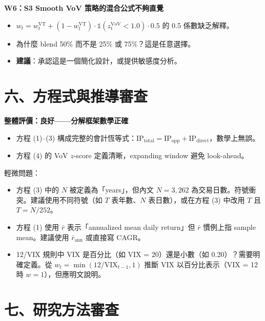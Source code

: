 \documentclass[12pt,a4paper]{article}
\begin{document}
\textcolor{warncolor}{\textbf{W6：S3 Smooth VoV 策略的混合公式不夠直覺}}

\begin{itemize}[leftmargin=2em]
\item $w_t = w_t^{\text{VT}} + (1 - w_t^{\text{VT}}) \cdot \mathbb{1}(z_t^{\text{VoV}} < 1.0) \cdot 0.5$ 的 0.5 係數缺乏解釋。
\item 為什麼 blend 50\% 而不是 25\% 或 75\%？這是任意選擇。
\item \textbf{建議}：承認這是一個簡化設計，或提供敏感度分析。
\end{itemize}

\section*{六、方程式與推導審查}

\textcolor{okgreen}{\textbf{整體評價：良好——分解框架數學正確}}

\begin{itemize}[leftmargin=2em]
\item 方程 (1)--(3) 構成完整的會計恆等式：$\text{IP}_{\text{total}} = \text{IP}_{\text{opp}} + \text{IP}_{\text{direct}}$，數學上無誤。
\item 方程 (4) 的 VoV $z$-score 定義清晰，expanding window 避免 look-ahead。
\end{itemize}

輕微問題：

\begin{itemize}[leftmargin=2em]
\item 方程 (3) 中的 $N$ 被定義為「years」，但內文 $N = 3{,}262$ 為交易日數。符號衝突。建議使用不同符號（如 $T$ 表年數、$N$ 表日數），或在方程 (3) 中改用 $T$ 且 $T = N/252$。
\item 方程 (1) 使用 $\bar{r}$ 表示「annualized mean daily return」但 $\bar{r}$ 慣例上指 sample mean。建議使用 $\bar{r}_{\text{ann}}$ 或直接寫 CAGR。
\item 12/VIX 規則中 VIX 是百分比（如 VIX = 20）還是小數（如 0.20）？需要明確定義。從 $w_t = \min(12/\text{VIX}_{t-1}, 1)$ 推斷 VIX 以百分比表示（VIX = 12 時 $w = 1$），但應明文說明。
\end{itemize}

\section*{七、研究方法審查}
\end{document}
